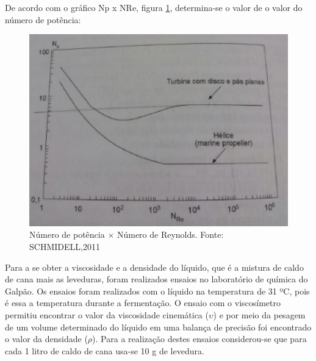 De acordo com o gráfico Np x NRe, figura \ref{reynolds}, determina-se o valor de o valor do número de potência:

\begin{figure}[H]
	\centering
  \includegraphics[keepaspectratio=true,scale=0.6]{figuras/reynolds.eps}
  \caption{  Número de potência \(\times\) Número de Reynolds. Fonte: SCHMIDELL,2011}
  \label{reynolds}
\end{figure}

Para a se obter a viscosidade e a densidade do líquido, que é a mistura de caldo de cana mais as leveduras, foram realizados ensaios no laboratório de química do Galpão. Os ensaios foram realizados com o líquido na temperatura de 31 ºC, pois é essa a temperatura durante a fermentação. O ensaio com o viscosímetro permitiu encontrar o valor da viscosidade cinemática (\(\upsilon\)) e por meio da pesagem de um volume determinado do líquido em uma balança de precisão foi encontrado o valor da densidade (\(\rho\)). Para a realização destes ensaios considerou-se  que para cada 1 litro de caldo de cana usa-se 10 g de levedura.

